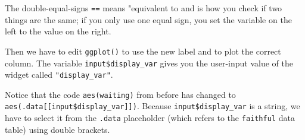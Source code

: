 \documentclass[
  oneside]{book}
\newenvironment{Shaded}{\begin{snugshade}}{\end{snugshade}}
\newcommand{\AttributeTok}[1]{\textcolor[rgb]{0.77,0.63,0.00}{#1}}
\newcommand{\CommentTok}[1]{\textcolor[rgb]{0.56,0.35,0.01}{\textit{#1}}}
\newcommand{\ControlFlowTok}[1]{\textcolor[rgb]{0.13,0.29,0.53}{\textbf{#1}}}
\newcommand{\FunctionTok}[1]{\textcolor[rgb]{0.00,0.00,0.00}{#1}}
\newcommand{\NormalTok}[1]{#1}
\newcommand{\OtherTok}[1]{\textcolor[rgb]{0.56,0.35,0.01}{#1}}
\newcommand{\SpecialCharTok}[1]{\textcolor[rgb]{0.00,0.00,0.00}{#1}}
\newcommand{\StringTok}[1]{\textcolor[rgb]{0.31,0.60,0.02}{#1}}
\begin{document}
\begin{Shaded}
\end{Shaded}

\begin{warning}
The double-equal-signs \texttt{==} means "equivalent to and is how you check if two things are the same; if you only use one equal sign, you set the variable on the left to the value on the right.

\end{warning}

Then we have to edit \texttt{ggplot}\texttt{()} to use the new label and to plot the correct column. The variable \texttt{input\$display\_var} gives you the user-input value of the widget called \texttt{"display\_var"}.

\begin{Shaded}
\end{Shaded}

\begin{warning}
Notice that the code \texttt{aes}\texttt{(waiting)} from before has changed to \texttt{aes}\texttt{(.data[[input\$display\_var]])}. Because \texttt{input\$display\_var} is a string, we have to select it from the \texttt{.data} placeholder (which refers to the \texttt{faithful} data table) using double brackets.

\end{warning}
\end{document}
